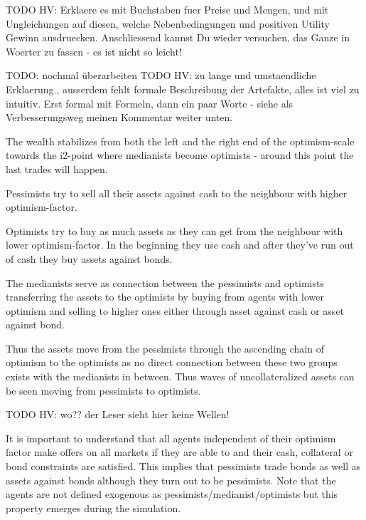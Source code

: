 \documentclass[Bachelorarbeit.tex]{subfiles}
\begin{document}
TODO HV: Erklaere es mit Buchstaben fuer Preise und Mengen, und mit Ungleichungen auf diesen, welche Nebenbedingungen und positiven Utility Gewinn ausdruecken. Anschliessend kannst Du wieder versuchen, das Ganze in Woerter zu fassen - es ist nicht so leicht!











TODO: nochmal überarbeiten
TODO HV: zu lange und umstaendliche Erklaerung., ausserdem fehlt formale Beschreibung der Artefakte, alles ist viel zu intuitiv. Erst formal mit Formeln, dann ein paar Worte - siehe als Verbesserungsweg meinen Kommentar weiter unten.


The wealth stabilizes from both the left and the right end of the optimism-scale towards the i2-point where medianists become optimists - around this point the last trades will happen.

\medskip 

Pessimists try to sell all their assets against cash to the neighbour with higher optimism-factor.

\medskip 

Optimists try to buy as much assets as they can get from the neighbour with lower optimism-factor. In the beginning they use cash and after they've run out of cash they buy assets against bonds.

\medskip 

The medianists serve as connection between the pessimists and optimists transferring the assets to the optimists by buying from agents with lower optimism and selling to higher ones either through asset against cash or asset against bond.

\medskip 

Thus the assets move from the pessimists through the ascending chain of optimism to the optimists as no direct connection between these two groups exists with the medianists in between. Thus waves of uncollateralized assets can be seen moving from pessimists to optimists.

TODO HV: wo?? der Leser sieht hier keine Wellen!

\medskip 

It is important to understand that all agents independent of their optimism factor make offers on all markets if they are able to and their cash, collateral or bond constraints are satisfied. This implies that pessimists trade bonds as well as assets against bonds although they turn out to be pessimists. Note that the agents are not defined exogenous as pessimists/medianist/optimists but this property emerges during the simulation.
\end{document}
